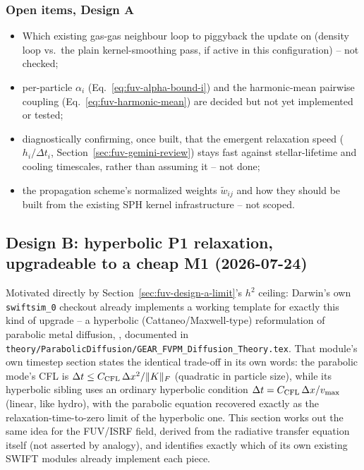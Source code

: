 \subsubsection{Open items, Design A}
\label{sec:fuv-design-a-open}

\begin{itemize}
  \item Which existing gas-gas neighbour loop to piggyback the update
    on (density loop vs.\ the plain 
    kernel-smoothing pass, if active in this configuration) -- not
    checked;
  \item per-particle $\alpha_i$ (Eq.~\ref{eq:fuv-alpha-bound-i}) and the
    harmonic-mean pairwise coupling (Eq.~\ref{eq:fuv-harmonic-mean}) are
    decided but not yet implemented or tested;
  \item diagnostically confirming, once built, that the emergent
    relaxation speed ($h_i/\Delta t_i$, Section~\ref{sec:fuv-gemini-review})
    stays fast against stellar-lifetime and cooling timescales, rather
    than assuming it -- not done;
  \item the propagation scheme's normalized weights $\tilde w_{ij}$ and
    how they should be built from the existing SPH kernel
    infrastructure -- not scoped.
\end{itemize}

\subsection{Design B: hyperbolic P1 relaxation, upgradeable to a cheap
M1 (2026-07-24)}
\label{sec:fuv-design-b}

Motivated directly by Section~\ref{sec:fuv-design-a-limit}'s $h^2$
ceiling: Darwin's own \texttt{swiftsim\_0} checkout already implements
a working template for exactly this kind of upgrade -- a hyperbolic
(Cattaneo/Maxwell-type) reformulation of parabolic metal diffusion,
, documented in
\texttt{theory/ParabolicDiffusion/GEAR\_FVPM\_Diffusion\_Theory.tex}.
That module's own timestep section states the identical trade-off in
its own words: the parabolic mode's CFL is
$\Delta t\le C_{\rm CFL}\,\Delta x^2/\|K\|_F$ (quadratic in particle size),
while its hyperbolic sibling uses an ordinary hyperbolic condition
$\Delta t = C_{\rm CFL}\,\Delta x/v_{\max}$ (linear, like hydro), with the
parabolic equation recovered exactly as the relaxation-time-to-zero
limit of the hyperbolic one. This section works out the same idea for
the FUV/ISRF field, derived from the radiative transfer equation
itself (not asserted by analogy), and identifies exactly which of its
own existing SWIFT modules already implement each piece.

